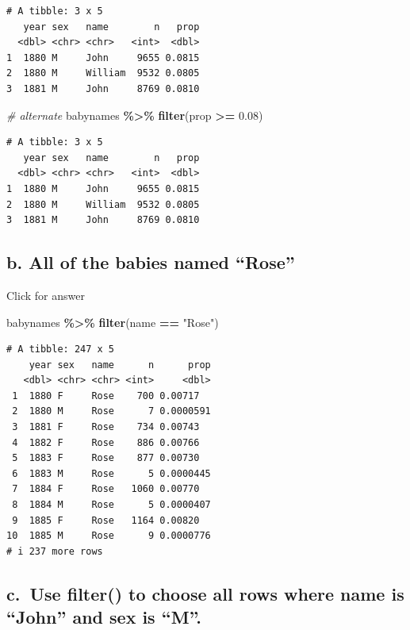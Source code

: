 \documentclass[
]{book}
\newenvironment{Shaded}{\begin{snugshade}}{\end{snugshade}}
\newcommand{\CommentTok}[1]{\textcolor[rgb]{0.56,0.35,0.01}{\textit{#1}}}
\newcommand{\FloatTok}[1]{\textcolor[rgb]{0.00,0.00,0.81}{#1}}
\newcommand{\FunctionTok}[1]{\textcolor[rgb]{0.13,0.29,0.53}{\textbf{#1}}}
\newcommand{\NormalTok}[1]{#1}
\newcommand{\SpecialCharTok}[1]{\textcolor[rgb]{0.81,0.36,0.00}{\textbf{#1}}}
\newcommand{\StringTok}[1]{\textcolor[rgb]{0.31,0.60,0.02}{#1}}
\begin{document}
\begin{verbatim}
# A tibble: 3 x 5
   year sex   name        n   prop
  <dbl> <chr> <chr>   <int>  <dbl>
1  1880 M     John     9655 0.0815
2  1880 M     William  9532 0.0805
3  1881 M     John     8769 0.0810
\end{verbatim}

\begin{Shaded}
\begin{Highlighting}[]
\CommentTok{\# alternate}
\NormalTok{babynames }\SpecialCharTok{\%\textgreater{}\%} \FunctionTok{filter}\NormalTok{(prop }\SpecialCharTok{\textgreater{}=} \FloatTok{0.08}\NormalTok{)}
\end{Highlighting}
\end{Shaded}

\begin{verbatim}
# A tibble: 3 x 5
   year sex   name        n   prop
  <dbl> <chr> <chr>   <int>  <dbl>
1  1880 M     John     9655 0.0815
2  1880 M     William  9532 0.0805
3  1881 M     John     8769 0.0810
\end{verbatim}

\hypertarget{b.-all-of-the-babies-named-rose}{%
\subsection{b. All of the babies named ``Rose''}\label{b.-all-of-the-babies-named-rose}}

Click for answer

\begin{Shaded}
\begin{Highlighting}[]
\NormalTok{babynames }\SpecialCharTok{\%\textgreater{}\%} \FunctionTok{filter}\NormalTok{(name }\SpecialCharTok{==} \StringTok{"Rose"}\NormalTok{)}
\end{Highlighting}
\end{Shaded}

\begin{verbatim}
# A tibble: 247 x 5
    year sex   name      n      prop
   <dbl> <chr> <chr> <int>     <dbl>
 1  1880 F     Rose    700 0.00717  
 2  1880 M     Rose      7 0.0000591
 3  1881 F     Rose    734 0.00743  
 4  1882 F     Rose    886 0.00766  
 5  1883 F     Rose    877 0.00730  
 6  1883 M     Rose      5 0.0000445
 7  1884 F     Rose   1060 0.00770  
 8  1884 M     Rose      5 0.0000407
 9  1885 F     Rose   1164 0.00820  
10  1885 M     Rose      9 0.0000776
# i 237 more rows
\end{verbatim}

\hypertarget{c.-use-filter-to-choose-all-rows-where-name-is-john-and-sex-is-m.}{%
\subsection{c.~Use filter() to choose all rows where name is ``John'' and sex is ``M''.}\label{c.-use-filter-to-choose-all-rows-where-name-is-john-and-sex-is-m.}}
\end{document}

